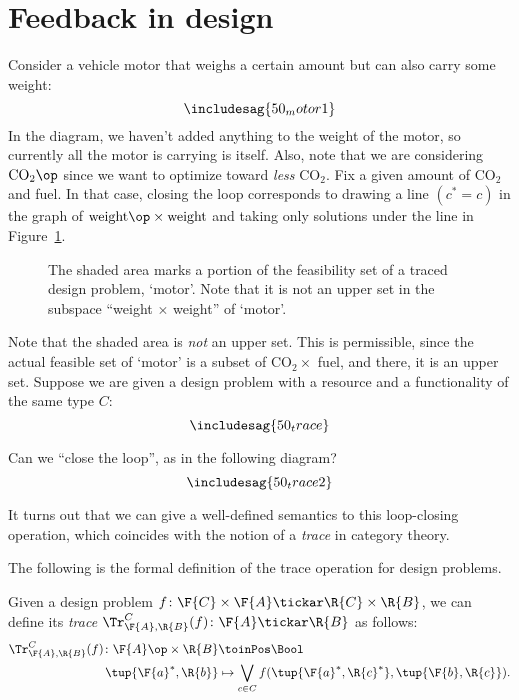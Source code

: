 \section{Feedback in design}
\begin{example}Consider a vehicle motor that weighs a certain amount but can also carry some weight:
\[
\includesag{50_motor1}
\]
In the diagram, we haven't added anything to the weight of the motor, so currently all the motor is carrying is itself. Also, note that we are considering $\text{CO}_2\op$ since we want to optimize toward \emph{less} CO$_2$. Fix a given amount of CO$_2$ and fuel. In that case, closing the loop corresponds to drawing a line $(c^\ast = c)$ in the graph of $\text{weight}\op \times \text{weight}$ and taking only solutions under the line in Figure~\ref{fig:weightcarrier}.
\begin{figure}[h!]
\centering
{}
\caption{The shaded area marks a portion of the feasibility set of a traced design problem, `motor'. Note that it is not an upper set in the subspace ``weight $\times$ weight'' of `motor'.}
\label{fig:weightcarrier}
\end{figure}
\end{example}

Note that the shaded area is \emph{not} an upper set. This is permissible, since the actual feasible set of `motor' is a subset of CO$_2 \times$ fuel, and there, it is an upper set.
Suppose we are given a design problem with a resource and a functionality of the same type $C$:
\[
\includesag{50_trace}
\]

Can we ``close the loop'', as in the following diagram?
\[\label{eq:looped}
\includesag{50_trace2}
\]

It turns out that we can give a well-defined semantics to this loop-closing operation, which coincides with the notion of a \emph{trace} in category theory.

The following is the formal definition of the trace operation for design problems.

\begin{definition}
\label{def:dp-trace}
Given a design problem $f\colon \F{C} \times \F{A} \tickar \R{C} \times \R{B}$, we can define
its \emph{trace} $\Tr_{\F{A},\R{B}}^C(f) \colon \F{A} \tickar \R{B}$ as follows:
%
\begin{equation}
\label{eq:tracedef}
\begin{aligned}
	\Tr_{\F{A},\R{B}}^C(f) \colon  \F{A}\op \times \R{B} &\toinPos \Bool \\
	\tup{\F{a}^*, \R{b}} &\mapsto \bigvee_{c\in C}
		f(
			\tup{\F{a}^*, \R{c}^*},
			\tup{\F{b}, \R{c}}
		).
\end{aligned}
\end{equation}
\end{definition}



